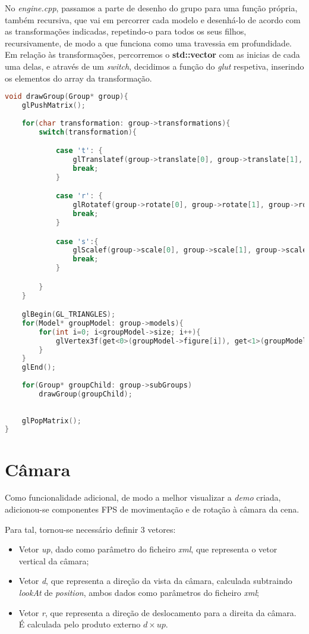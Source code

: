 \documentclass[14pt, a4 paper]{report}
\begin{document}
No \textit{engine.cpp}, passamos a parte de desenho do grupo para uma função própria, também recursiva, que vai em percorrer cada modelo e desenhá-lo de acordo com as transformações indicadas, repetindo-o para todos os seus filhos, recursivamente, de modo a que funciona como uma travessia em profundidade.
Em relação às transformações, percorremos o \textbf{std::vector} com as inicias de cada uma delas, e através de um \textit{switch}, decidimos a função do \textit{glut} respetiva, inserindo os elementos do array da transformação.

\begin{lstlisting}[language = c++]
void drawGroup(Group* group){
	glPushMatrix();
	
	for(char transformation: group->transformations){
		switch(transformation){

			case 't': {
				glTranslatef(group->translate[0], group->translate[1], group->translate[2]);
				break;
			}

			case 'r': {
				glRotatef(group->rotate[0], group->rotate[1], group->rotate[2], group->rotate[3]);
				break;
			}

			case 's':{
				glScalef(group->scale[0], group->scale[1], group->scale[2]);
				break;
			}

		}
	}

	glBegin(GL_TRIANGLES);
	for(Model* groupModel: group->models){
		for(int i=0; i<groupModel->size; i++){
			glVertex3f(get<0>(groupModel->figure[i]), get<1>(groupModel->figure[i]), get<2>(groupModel->figure[i]));
		}
	}
	glEnd();
	
	for(Group* groupChild: group->subGroups)
		drawGroup(groupChild);
	
	
	glPopMatrix();
}
\end{lstlisting}

\section{Câmara}

Como funcionalidade adicional, de modo a melhor visualizar a \textit{demo} criada, adicionou-se componentes FPS de movimentação e de rotação à câmara da cena.

Para tal, tornou-se necessário definir 3 vetores:

\begin{itemize}
    \item Vetor \textit{up}, dado como parâmetro do ficheiro \textit{xml}, que representa o vetor vertical da câmara;
    \item Vetor \textit{d}, que representa a direção da vista da câmara, calculada subtraindo \textit{lookAt} de \textit{position}, ambos dados como parâmetros do ficheiro \textit{xml};
    \item Vetor \textit{r}, que representa a direção de deslocamento para a direita da câmara. É calculada pelo produto externo \textit{$d \times up$}.
\end{itemize}
\end{document}
